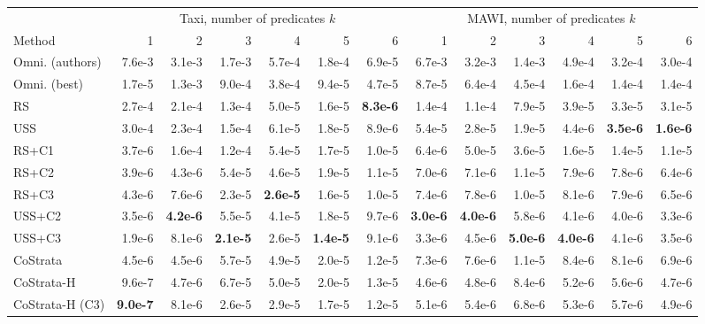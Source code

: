 \begin{tabular}{lrrrrrrrrrrrr}
\toprule
 & \multicolumn{6}{c}{Taxi, number of predicates $k$} & \multicolumn{6}{c}{MAWI, number of predicates $k$} \\
Method & 1 & 2 & 3 & 4 & 5 & 6 & 1 & 2 & 3 & 4 & 5 & 6 \\
\midrule
Omni. (authors) & 7.6e-3 & 3.1e-3 & 1.7e-3 & 5.7e-4 & 1.8e-4 & 6.9e-5 & 6.7e-3 & 3.2e-3 & 1.4e-3 & 4.9e-4 & 3.2e-4 & 3.0e-4 \\
Omni. (best) & 1.7e-5 & 1.3e-3 & 9.0e-4 & 3.8e-4 & 9.4e-5 & 4.7e-5 & 8.7e-5 & 6.4e-4 & 4.5e-4 & 1.6e-4 & 1.4e-4 & 1.4e-4 \\
RS & 2.7e-4 & 2.1e-4 & 1.3e-4 & 5.0e-5 & 1.6e-5 & \textbf{8.3e-6} & 1.4e-4 & 1.1e-4 & 7.9e-5 & 3.9e-5 & 3.3e-5 & 3.1e-5 \\
USS & 3.0e-4 & 2.3e-4 & 1.5e-4 & 6.1e-5 & 1.8e-5 & 8.9e-6 & 5.4e-5 & 2.8e-5 & 1.9e-5 & 4.4e-6 & \textbf{3.5e-6} & \textbf{1.6e-6} \\
RS+C1 & 3.7e-6 & 1.6e-4 & 1.2e-4 & 5.4e-5 & 1.7e-5 & 1.0e-5 & 6.4e-6 & 5.0e-5 & 3.6e-5 & 1.6e-5 & 1.4e-5 & 1.1e-5 \\
RS+C2 & 3.9e-6 & 4.3e-6 & 5.4e-5 & 4.6e-5 & 1.9e-5 & 1.1e-5 & 7.0e-6 & 7.1e-6 & 1.1e-5 & 7.9e-6 & 7.8e-6 & 6.4e-6 \\
RS+C3 & 4.3e-6 & 7.6e-6 & 2.3e-5 & \textbf{2.6e-5} & 1.6e-5 & 1.0e-5 & 7.4e-6 & 7.8e-6 & 1.0e-5 & 8.1e-6 & 7.9e-6 & 6.5e-6 \\
USS+C2 & 3.5e-6 & \textbf{4.2e-6} & 5.5e-5 & 4.1e-5 & 1.8e-5 & 9.7e-6 & \textbf{3.0e-6} & \textbf{4.0e-6} & 5.8e-6 & 4.1e-6 & 4.0e-6 & 3.3e-6 \\
USS+C3 & 1.9e-6 & 8.1e-6 & \textbf{2.1e-5} & 2.6e-5 & \textbf{1.4e-5} & 9.1e-6 & 3.3e-6 & 4.5e-6 & \textbf{5.0e-6} & \textbf{4.0e-6} & 4.1e-6 & 3.5e-6 \\
CoStrata & 4.5e-6 & 4.5e-6 & 5.7e-5 & 4.9e-5 & 2.0e-5 & 1.2e-5 & 7.3e-6 & 7.6e-6 & 1.1e-5 & 8.4e-6 & 8.1e-6 & 6.9e-6 \\
CoStrata-H & 9.6e-7 & 4.7e-6 & 6.7e-5 & 5.0e-5 & 2.0e-5 & 1.3e-5 & 4.6e-6 & 4.8e-6 & 8.4e-6 & 5.2e-6 & 5.6e-6 & 4.7e-6 \\
CoStrata-H (C3) & \textbf{9.0e-7} & 8.1e-6 & 2.6e-5 & 2.9e-5 & 1.7e-5 & 1.2e-5 & 5.1e-6 & 5.4e-6 & 6.8e-6 & 5.3e-6 & 5.7e-6 & 4.9e-6 \\
\bottomrule
\end{tabular}
